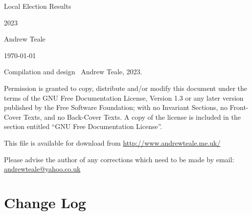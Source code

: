 \documentclass[a4paper,openany]{book}
\begin{document}

\begin{titlepage}

\begin{center}

\Huge Local Election Results

2023

\bigskip

\Large Andrew Teale

\vfill

\newcommand\versionno{0.10.1}


\today

\end{center}

\end{titlepage}


\begin{center}

%

\bigskip

Compilation and design \textcopyright\ Andrew Teale, 2023.

 Permission is granted to copy, distribute and/or modify this document
 under the terms of the GNU Free Documentation License, Version 1.3
 or any later version published by the Free Software Foundation;
 with no Invariant Sections, no Front-Cover Texts, and no Back-Cover Texts.
 A copy of the license is included in the section entitled ``GNU
 Free Documentation License''.

\bigskip

This file is available for download from
\url{http://www.andrewteale.me.uk/}

\bigskip

Please advise the author of any corrections which need to be made by
email: \url{andrewteale@yahoo.co.uk}

\vfill
\end{center}

\section*{Change Log}


%
\end{document}
